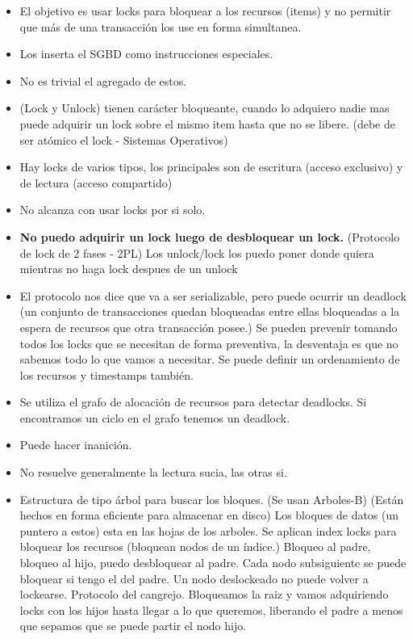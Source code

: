 \begin{itemize}
\item El objetivo es usar locks para bloquear a los recursos (items) y no permitir que más de una transacción los use en forma simultanea.
\item Los inserta el SGBD como instrucciones especiales.
\item No es trivial el agregado de estos.
\item (Lock y Unlock) tienen carácter bloqueante, cuando lo adquiero nadie mas puede adquirir un lock sobre el mismo item hasta que no se libere. (debe de ser atómico el lock - Sistemas Operativos)
\item Hay locks de varios tipos, los principales son de escritura (acceso exclusivo) y de lectura (acceso compartido)
\item No alcanza con usar locks por si solo.
\item \textbf{No puedo adquirir un lock luego de desbloquear un lock.} (Protocolo de lock de 2 fases - 2PL) Los unlock/lock los puedo poner donde quiera mientras no haga lock despues de un unlock
\item El protocolo nos dice que va a ser serializable, pero puede ocurrir un deadlock (un conjunto de transacciones quedan bloqueadas entre ellas bloqueadas a la espera de recursos que otra transacción posee.) Se pueden prevenir tomando todos los locks que se necesitan de forma preventiva, la desventaja es que no sabemos todo lo que vamos a necesitar. Se puede definir un ordenamiento de los recursos y timestamps también.
\item Se utiliza el grafo de alocación de recursos para detectar deadlocks. Si encontramos un ciclo en el grafo tenemos un deadlock.
\item Puede hacer inanición.
\item No resuelve generalmente la lectura sucia, las otras si.
\item Estructura de tipo árbol para buscar los bloques. (Se usan Arboles-B) (Están hechos en forma eficiente para almacenar en disco) Los bloques de datos (un puntero a estos) esta en las hojas de los arboles. Se aplican index locks para bloquear los recursos (bloquean nodos de un índice.) Bloqueo al padre, bloqueo al hijo, puedo desbloquear al padre. Cada nodo subsiguiente se puede bloquear si tengo el del padre. Un nodo deslockeado no puede volver a lockearse. Protocolo del cangrejo. Bloqueamos la raiz y vamos adquiriendo locks con los hijos hasta llegar a lo que queremos, liberando el padre a menos que sepamos que se puede partir el nodo hijo.
\end{itemize}



